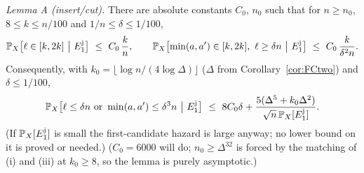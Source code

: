 \emph{Lemma A (insert/cut).}  There are absolute constants $C_0$,
$n_0$ such that for $n\ge n_0$, $8\le k\le n/100$ and
$1/n\le\delta\le1/100$,
\[
\Pr_X\bigl[\ell\in[k,2k]\ \big|\ E_1^{\rm j}\bigr]\ \le\ C_0\,\frac kn,
\qquad
\Pr_X\bigl[\min(a,a')\in[k,2k],\ \ell\ge\delta n\ \big|\ E_1^{\rm j}\bigr]\ \le\ C_0\,\frac{k}{\delta^2n} .
\]
Consequently, with $k_0=\lfloor\log n/(4\log\Delta)\rfloor$ ($\Delta$
from Corollary~\ref{cor:FCtwo}) and $\delta\le1/100$,
\[
\Pr_X\bigl[\ell\le\delta n\text{ or }\min(a,a')\le\delta^3 n\ \big|\ E_1^{\rm j}\bigr]
\ \le\ 8C_0\delta+\frac{5(\Delta^5+k_0\Delta^2)}{\sqrt n\,\Pr_X[E_1^{\rm j}]}.
\]
(If $\Pr_X[E_1^{\rm j}]$ is small the first-candidate hazard is large
anyway; no lower bound on it is proved or needed.)
($C_0=6000$ will do; $n_0\ge\Delta^{32}$ is forced by the matching of
(i) and (iii) at $k_0\ge8$, so the lemma is purely asymptotic.)


